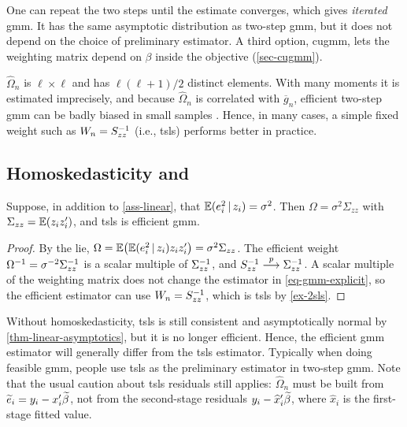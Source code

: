 \documentclass[a4paper,12pt]{article}
\begin{document}
\begin{remark}[Iterating]
	One can repeat the two steps until the estimate converges, which gives \emph{iterated} \gls{gmm}.
	It has the same asymptotic distribution as two-step \gls{gmm}, but it does not depend on the choice of preliminary estimator.
	A third option, \gls{cugmm}, lets the weighting matrix depend on $\beta$ inside the objective (\autoref{sec-cugmm}).
\end{remark}

\begin{remark}\label{rmk-practical-concerns}
	$\widehat\Omega_n$ is $\ell\times\ell$ and has $\ell(\ell+1)/2$ distinct elements.
	With many moments it is estimated imprecisely, and because $\widehat\Omega_n$ is correlated with $\overline g_n$,
	efficient two-step \gls{gmm} can be badly biased in small samples \parencite{altonji-segal-1996}.
	Hence, in many cases, a simple fixed weight such as $W_n=S_{zz}^{-1}$ (i.e., \gls{tsls}) performs better in practice.
\end{remark}

\subsection{Homoskedasticity and }

\begin{proposition}
	Suppose, in addition to \autoref{ass-linear}, that $\operatorname{\mathbb{E}}(e_i^2\mathpunct{}|\mathpunct{} z_i)=\sigma^2$.
	Then $\Omega=\sigma^2\Sigma_{zz}$ with $\Sigma_{zz}=\operatorname{\mathbb{E}}(z_iz_i^{\prime})$, and \gls{tsls} is efficient \gls{gmm}.
\end{proposition}
\begin{proof}
	By the \gls{lie}, $\Omega=\operatorname{\mathbb{E}}\bigl(\operatorname{\mathbb{E}}(e_i^2\mathpunct{}|\mathpunct{} z_i)z_iz_i^{\prime}\bigr)=\sigma^2\Sigma_{zz}$.
	The efficient weight $\Omega^{-1}=\sigma^{-2}\Sigma_{zz}^{-1}$ is a scalar multiple of $\Sigma_{zz}^{-1}$,
	and $S_{zz}^{-1}\overset{p}{\longrightarrow}\Sigma_{zz}^{-1}$.
	A scalar multiple of the weighting matrix does not change the estimator in \eqref{eq-gmm-explicit},
	so the efficient estimator can use $W_n=S_{zz}^{-1}$, which is \gls{tsls} by \autoref{ex-2sls}.
\end{proof}

\begin{remark}
	Without homoskedasticity, \gls{tsls} is still consistent and asymptotically normal by \autoref{thm-linear-asymptotics},
	but it is no longer efficient.
	Hence, the efficient \gls{gmm} estimator will generally differ from the \gls{tsls} estimator.
	Typically when doing feasible \gls{gmm}, people use \gls{tsls} as the preliminary estimator in two-step \gls{gmm}.
	Note that the usual caution about \gls{tsls} residuals still applies:
	$\widehat\Omega_n$ must be built from $\widetilde e_i=y_i-x_i^{\prime}\widetilde\beta$, not from the second-stage residuals $y_i-\widehat x_i^{\prime}\widetilde\beta$, where $\widehat x_i$ is the first-stage fitted value.
\end{remark}
\end{document}
